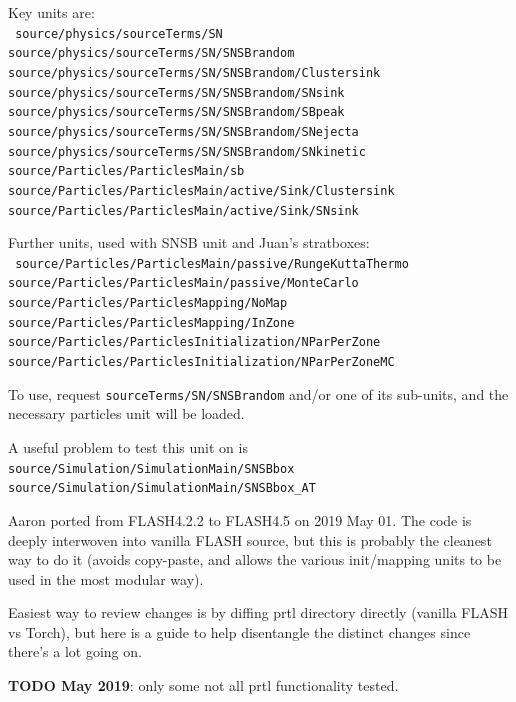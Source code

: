 \documentclass[10pt]{article}
\begin{document}
Key units are: \\
\texttt{
source/physics/sourceTerms/SN \\
source/physics/sourceTerms/SN/SNSBrandom \\
source/physics/sourceTerms/SN/SNSBrandom/Clustersink \\
source/physics/sourceTerms/SN/SNSBrandom/SNsink \\
source/physics/sourceTerms/SN/SNSBrandom/SBpeak \\
source/physics/sourceTerms/SN/SNSBrandom/SNejecta \\
source/physics/sourceTerms/SN/SNSBrandom/SNkinetic \\
source/Particles/ParticlesMain/sb \\
source/Particles/ParticlesMain/active/Sink/Clustersink \\
source/Particles/ParticlesMain/active/Sink/SNsink \\
}

Further units, used with SNSB unit and Juan's stratboxes: \\
\texttt{
source/Particles/ParticlesMain/passive/RungeKuttaThermo \\
source/Particles/ParticlesMain/passive/MonteCarlo \\
source/Particles/ParticlesMapping/NoMap \\
source/Particles/ParticlesMapping/InZone \\
source/Particles/ParticlesInitialization/NParPerZone \\
source/Particles/ParticlesInitialization/NParPerZoneMC
}

To use, request \texttt{sourceTerms/SN/SNSBrandom} and/or one of its sub-units,
and the necessary particles unit will be loaded.

A useful problem to test this unit on is
\texttt{
source/Simulation/SimulationMain/SNSBbox \\
source/Simulation/SimulationMain/SNSBbox\_AT
}

Aaron ported from FLASH4.2.2 to FLASH4.5 on 2019 May 01.  The code is deeply
interwoven into vanilla FLASH source, but this is probably the cleanest way to
do it (avoids copy-paste, and allows the various init/mapping units to be used
in the most modular way).

Easiest way to review changes is by diffing prtl directory directly (vanilla
FLASH vs Torch), but here is a guide to help disentangle the distinct changes
since there's a lot going on.

\textbf{TODO May 2019}: only some not all prtl functionality tested.
\end{document}
